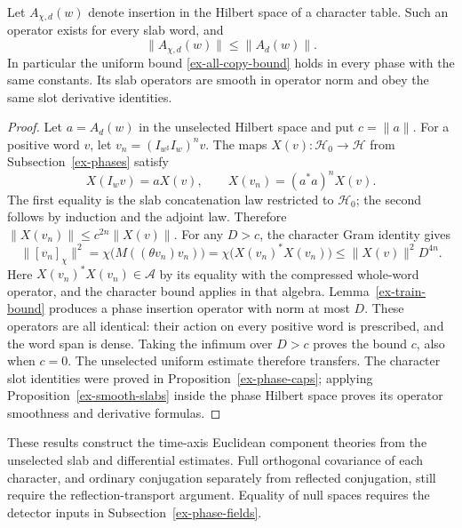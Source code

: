 \begin{proposition}
\label{ex-phase-slab-bounds}
Let \(A_{\chi,d}(w)\) denote insertion in the Hilbert space of a
character table. Such an operator exists for every slab word, and
\[
 \|A_{\chi,d}(w)\|\le\|A_d(w)\|.
\]
In particular the uniform bound \eqref{ex-all-copy-bound} holds in every
phase with the same constants. Its slab operators are smooth in operator
norm and obey the same slot derivative identities.
\end{proposition}
\begin{proof}
Let \(a=A_d(w)\) in the unselected Hilbert space and put
\(c=\|a\|\). For a positive word \(v\), let
\(v_n=(I_{w^\sharp}I_w)^nv\). The maps
\(X(v):\mathcal H_0\to\mathcal H\) from Subsection~\ref{ex-phases}
satisfy
\[
 X(I_wv)=aX(v),\qquad X(v_n)=(a^*a)^nX(v).
\]
The first equality is the slab concatenation law restricted to
\(\mathcal H_0\); the second follows by induction and the adjoint
law. Therefore \(\|X(v_n)\|\le c^{2n}\|X(v)\|\).
For any \(D>c\), the character Gram identity gives
\[
 \|[v_n]_\chi\|^2
 =\chi\bigl(M((\theta v_n)v_n)\bigr)
 =\chi\bigl(X(v_n)^*X(v_n)\bigr)
 \le\|X(v)\|^2D^{4n}.
\]
Here \(X(v_n)^*X(v_n)\in\mathcal A\) by its equality with the
compressed whole-word operator, and the character bound applies in
that algebra. Lemma~\ref{ex-train-bound} produces a phase insertion
operator with norm at most \(D\). These operators are all identical:
their action on every positive word is prescribed, and the word span is
dense. Taking the infimum over \(D>c\) proves the bound \(c\), also
when \(c=0\). The unselected uniform estimate therefore transfers.
The character slot identities were proved in Proposition~\ref{ex-phase-caps};
applying Proposition~\ref{ex-smooth-slabs} inside the phase Hilbert space
proves its operator smoothness and derivative formulas.
\end{proof}

These results construct the time-axis Euclidean component theories from
the unselected slab and differential estimates. Full orthogonal covariance
of each character, and ordinary conjugation separately from reflected
conjugation, still require the reflection-transport argument. Equality of
null spaces requires the detector inputs in Subsection~\ref{ex-phase-fields}.
